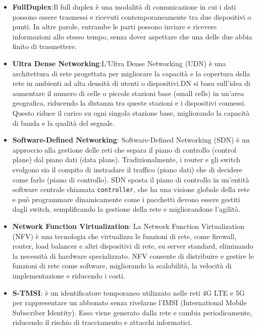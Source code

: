 \documentclass[english]{article}
\begin{document}
\begin{itemize}
	\item \textbf{FullDuplex}\hypertarget{FullDuplex}{}:Il full duplex è una modalità di comunicazione
	      in cui i dati possono essere trasmessi e ricevuti contemporaneamente tra due dispositivi
	      o punti. In altre parole, entrambe le parti possono inviare e ricevere informazioni allo
	      stesso tempo, senza dover aspettare che una delle due abbia finito di trasmettere.

	\item \textbf{Ultra Dense Networking}\hypertarget{UDN}{}:L'Ultra Dense Networking (UDN) è una
	      architettura di rete progettata per migliorare la capacità e la copertura della rete
	      in ambienti ad alta densità di utenti o dispositivi.DN si basa sull'idea di aumentare
	      il numero di celle o piccole stazioni base (small cells) in un'area geografica,
	      riducendo la distanza tra queste stazioni e i dispositivi connessi. Questo riduce il
	      carico su ogni singola stazione base, migliorando la capacità di banda e la qualità
	      del segnale.

	\item \textbf{Software-Defined Networking}\hypertarget{SDN}{}:  Software-Defined Networking (SDN)
	      è un approccio alla gestione delle reti che separa il piano di controllo (control plane)
	      dal piano dati (data plane). Tradizionalmente, i router e gli switch svolgono sia il
	      compito di instradare il traffico (piano dati) che di decidere come farlo
	      (piano di controllo). SDN sposta il piano di controllo in un'entità software centrale
	      chiamata \texttt{controller}, che ha una visione globale della rete e può programmare
	      dinamicamente come i pacchetti devono essere gestiti dagli switch, semplificando la
	      gestione della rete e migliorandone l'agilità.

	\item \textbf{Network Function Virtualization}\hypertarget{NFV}{}: La Network Function
	      Virtualization (NFV) è una tecnologia che virtualizza le funzioni di rete, come firewall,
	      router, load balancer e altri dispositivi di rete, su server standard,
	      eliminando la necessità di hardware specializzato. NFV consente di distribuire e gestire
	      le funzioni di rete come software, migliorando la scalabilità, la velocità di
	      implementazione e riducendo i costi.

	\item \textbf{\hypertarget{S-TMSI}{S-TMSI}}: è un identificatore temporaneo
	      utilizzato nelle reti 4G LTE e 5G per rappresentare un abbonato senza rivelarne
	      l'IMSI (International Mobile Subscriber Identity).
	      Esso viene generato dalla rete e cambia periodicamente,
	      riducendo il rischio di tracciamento e attacchi informatici.


\end{itemize}
\end{document}
